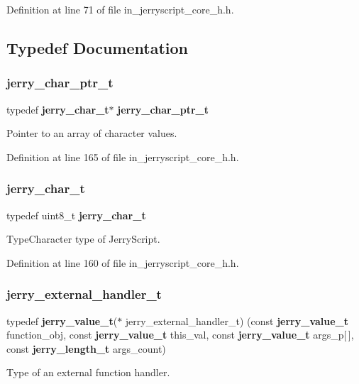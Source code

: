 Definition at line 71 of file in\+\_\+jerryscript\+\_\+core\+\_\+h.\+h.



\subsection{Typedef Documentation}
\mbox{\label{group___core_ga60b931b52fcab08d882b5db203d8985d}} 
\subsubsection{jerry\_char\_ptr\_t}
{\footnotesize\ttfamily typedef \textbf{ jerry\+\_\+char\+\_\+t}$\ast$ \textbf{ jerry\+\_\+char\+\_\+ptr\+\_\+t}}

Pointer to an array of character values. 

Definition at line 165 of file in\+\_\+jerryscript\+\_\+core\+\_\+h.\+h.

\mbox{\label{group___core_gad31d6b834d32d8b60ff97aded100691c}} 
\subsubsection{jerry\_char\_t}
{\footnotesize\ttfamily typedef uint8\+\_\+t \textbf{ jerry\+\_\+char\+\_\+t}}

Type\+Character type of Jerry\+Script. 

Definition at line 160 of file in\+\_\+jerryscript\+\_\+core\+\_\+h.\+h.

\mbox{\label{group___core_ga4b00ffab803fc271a3821515816802e8}} 
\subsubsection{jerry\_external\_handler\_t}
{\footnotesize\ttfamily typedef \textbf{ jerry\+\_\+value\+\_\+t}($\ast$ jerry\+\_\+external\+\_\+handler\+\_\+t) (const \textbf{ jerry\+\_\+value\+\_\+t} function\+\_\+obj, const \textbf{ jerry\+\_\+value\+\_\+t} this\+\_\+val, const \textbf{ jerry\+\_\+value\+\_\+t} args\+\_\+p[$\,$], const \textbf{ jerry\+\_\+length\+\_\+t} args\+\_\+count)}

Type of an external function handler. 

